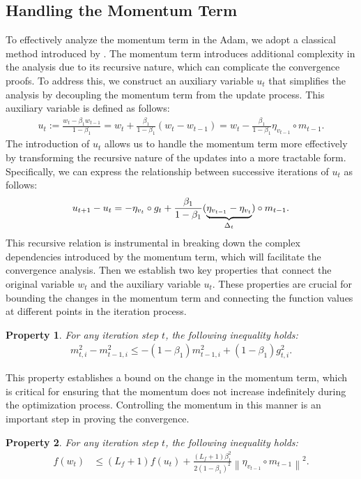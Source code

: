 \documentclass{article} %
\newtheorem{property}{\textbf{Property}}
\begin{document}
\subsection{Handling the Momentum Term}\label{momentum_term}
To effectively analyze the momentum term in the Adam, we adopt a classical method introduced by \cite{liu2020improved}. The momentum term introduces additional complexity in the analysis due to its recursive nature, which can complicate the convergence proofs. To address this, we construct an auxiliary variable \( u_{t} \) that simplifies the analysis by decoupling the momentum term from the update process. This auxiliary variable is defined as follows:
\begin{align}
u_{t} := \frac{w_{t} - \beta_{1} w_{t-1}}{1 - \beta_{1}} = w_t + \frac{\beta_1}{1-\beta_1}(w_t - w_{t-1}) = w_{t} - \frac{\beta_{1}}{1-\beta_{1}}\eta_{v_{t-1}}\circ m_{t-1}.
\end{align}
The introduction of \( u_{t} \) allows us to handle the momentum term more effectively by transforming the recursive nature of the updates into a more tractable form. Specifically, we can express the relationship between successive iterations of \( u_{t} \) as follows:
\begin{align}\label{u_{t}}
u_{t+1}-u_{t}= -\eta_{v_{t}}\circ g_{t}+\frac{\beta_{1}}{1-\beta_{1}}(\underbrace{\eta_{v_{t-1}}-\eta_{v_{t}}}_{\Delta_{t}})\circ m_{t-1}.
\end{align}
This recursive relation is instrumental in breaking down the complex dependencies introduced by the momentum term, which will facilitate the convergence analysis. Then we establish two key properties that connect the original variable \( w_{t} \) and the auxiliary variable \( u_{t} \). These properties are crucial for bounding the changes in the momentum term and connecting the function values at different points in the iteration process.
\begin{property}\label{property_3}
For any iteration step \( t \), the following inequality holds:
\begin{align*}
m_{t,i}^{2}-m_{t-1,i}^{2}\le -(1-\beta_{1})m_{t-1,i}^{2}+(1-\beta_{1})g_{t,i}^{2} .
\end{align*}
\end{property}
This property establishes a bound on the change in the momentum term, which is critical for ensuring that the momentum does not increase indefinitely during the optimization process. Controlling the momentum in this manner is an important step in proving the convergence.
\begin{property}\label{property_2}
For any iteration step \( t \), the following inequality holds:
\begin{align*}
f(w_{t})&\leq (L_{f}+1)f(u_t) + \frac{(L_{f}+1)\beta_{1}^{2}}{2(1-\beta_1)^{2}} \left\| \eta_{v_{t-1}} \circ m_{t-1} \right\|^{2}.
\end{align*}
\end{property}
\end{document}
